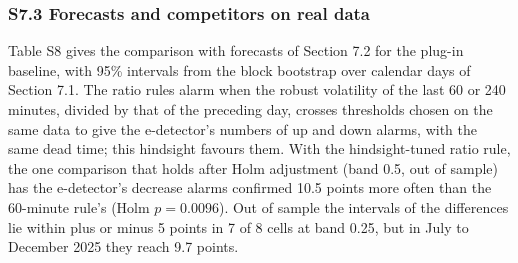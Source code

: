 \documentclass[
]{article}
\begin{document}
\hypertarget{s7.3-forecasts-and-competitors-on-real-data}{%
\subsubsection{S7.3 Forecasts and competitors on real
data}\label{s7.3-forecasts-and-competitors-on-real-data}}

Table S8 gives the comparison with forecasts of Section 7.2 for the
plug-in baseline, with 95\% intervals from the block bootstrap over
calendar days of Section 7.1. The ratio rules alarm when the robust
volatility of the last 60 or 240 minutes, divided by that of the
preceding day, crosses thresholds chosen on the same data to give the
e-detector's numbers of up and down alarms, with the same dead time;
this hindsight favours them. With the hindsight-tuned ratio rule, the
one comparison that holds after Holm adjustment (band 0.5, out of
sample) has the e-detector's decrease alarms confirmed 10.5 points more
often than the 60-minute rule's (Holm \(p = 0.0096\)). Out of sample the
intervals of the differences lie within plus or minus 5 points in 7 of 8
cells at band 0.25, but in July to December 2025 they reach 9.7 points.
\end{document}
